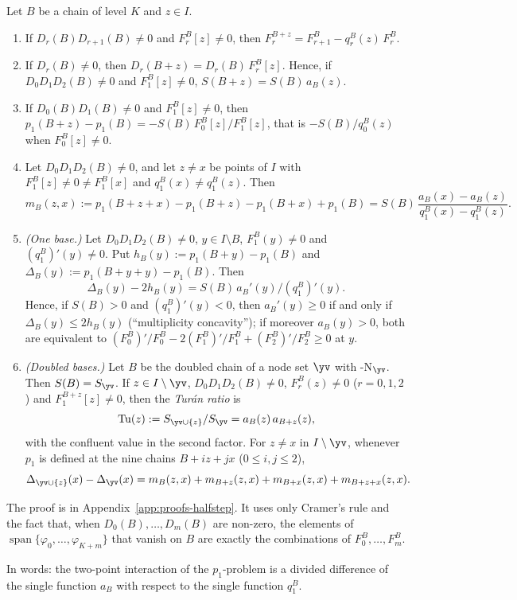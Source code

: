 \begin{proposition}\label{thm:halfstep}
Let $B$ be a chain of level $K$ and $z\in I$.
\begin{enumerate}[label=(H\arabic*),leftmargin=2.6em]
\item If $D_r(B)D_{r+1}(B)\ne0$ and $F_r^B[z]\ne0$, then $F_r^{B+z}=F_{r+1}^B-q_r^B(z)\,F_r^B$.
\item If $D_r(B)\ne0$, then $D_r(B+z)=D_r(B)\,F_r^B[z]$. Hence, if $D_0D_1D_2(B)\ne0$ and $F_1^B[z]\ne0$,
$S(B+z)=S(B)\,a_B(z)$.
\item If $D_0(B)D_1(B)\ne0$ and $F_1^B[z]\ne0$, then
$p_1(B+z)-p_1(B)=-S(B)\,F_0^B[z]/F_1^B[z]$, that is $-S(B)/q_0^B(z)$ when $F_0^B[z]\ne0$.
\item Let $D_0D_1D_2(B)\ne0$, and let $z\ne x$ be points of $I$ with $F_1^B[z]\ne0\ne F_1^B[x]$ and
$q_1^B(x)\ne q_1^B(z)$. Then
\[
m_B(z,x):=p_1(B+z+x)-p_1(B+z)-p_1(B+x)+p_1(B)=S(B)\,\frac{a_B(x)-a_B(z)}{q_1^B(x)-q_1^B(z)}.
\]
\item \emph{(One base.)} Let $D_0D_1D_2(B)\ne0$, $y\in I\setminus B$, $F_1^B(y)\ne0$ and $(q_1^B)'(y)\ne0$. Put
$h_B(y):=p_1(B+y)-p_1(B)$ and $\Delta_B(y):=p_1(B+y+y)-p_1(B)$. Then
\[
\Delta_B(y)-2h_B(y)=S(B)\,a_B'(y)/(q_1^B)'(y).
\]
Hence, if $S(B)>0$ and $(q_1^B)'(y)<0$, then $a_B'(y)\ge0$ if and only if $\Delta_B(y)\le2h_B(y)$
(``multiplicity concavity''); if moreover $a_B(y)>0$, both are equivalent to
$(F_0^B)'/F_0^B-2(F_1^B)'/F_1^B+(F_2^B)'/F_2^B\ge0$ at $y$.
\item \emph{(Doubled bases.)} Let $B$ be the doubled chain of a node set $\yv$ with \hyp{N}$_{\yv}$. Then
$S(B)=S_{\yv}$. If $z\in I\setminus\yv$, $D_0D_1D_2(B)\ne0$, $F_r^B(z)\ne0$ ($r=0,1,2$) and $F_1^{B+z}[z]\ne0$, then
the \emph{Tur\'an ratio} is
\[
\operatorname{Tu}(z):=S_{\yv\cup\{z\}}/S_{\yv}=a_B(z)\,a_{B+z}(z),
\]
with the confluent value in the second factor. For $z\ne x$ in $I\setminus\yv$, whenever $p_1$ is defined at the
nine chains $B+iz+jx$ ($0\le i,j\le2$),
\[
\Delta_{\yv\cup\{z\}}(x)-\Delta_{\yv}(x)=m_B(z,x)+m_{B+z}(z,x)+m_{B+x}(z,x)+m_{B+z+x}(z,x).
\]
\end{enumerate}
\end{proposition}

The proof is in Appendix~\ref{app:proofs-halfstep}. It uses only Cramer's rule and the fact that, when
$D_0(B),\dots,D_m(B)$ are non-zero, the elements of $\operatorname{span}\{\varphi_0,\dots,\varphi_{K+m}\}$ that vanish on $B$ are
exactly the combinations of $F_0^B,\dots,F_m^B$.

In words: the two-point interaction of the $p_1$-problem is a divided difference of the single function $a_B$ with
respect to the single function $q_1^B$.

